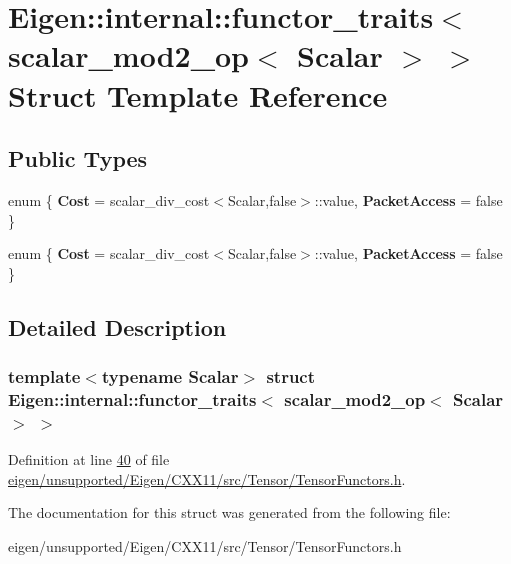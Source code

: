 \hypertarget{struct_eigen_1_1internal_1_1functor__traits_3_01scalar__mod2__op_3_01_scalar_01_4_01_4}{}\section{Eigen\+:\+:internal\+:\+:functor\+\_\+traits$<$ scalar\+\_\+mod2\+\_\+op$<$ Scalar $>$ $>$ Struct Template Reference}
\label{struct_eigen_1_1internal_1_1functor__traits_3_01scalar__mod2__op_3_01_scalar_01_4_01_4}
\subsection*{Public Types}
\begin{DoxyCompactItemize}
\item 
\mbox{\label{struct_eigen_1_1internal_1_1functor__traits_3_01scalar__mod2__op_3_01_scalar_01_4_01_4_a5255aa098ccb7fec717f0b2f7058271e}} 
enum \{ {\bfseries Cost} = scalar\+\_\+div\+\_\+cost$<$Scalar,false$>$\+:\+:value, 
{\bfseries Packet\+Access} = false
 \}
\item 
\mbox{\label{struct_eigen_1_1internal_1_1functor__traits_3_01scalar__mod2__op_3_01_scalar_01_4_01_4_a14d232238eb4d7eda8fd2d42fb7a45c4}} 
enum \{ {\bfseries Cost} = scalar\+\_\+div\+\_\+cost$<$Scalar,false$>$\+:\+:value, 
{\bfseries Packet\+Access} = false
 \}
\end{DoxyCompactItemize}


\subsection{Detailed Description}
\subsubsection*{template$<$typename Scalar$>$\newline
struct Eigen\+::internal\+::functor\+\_\+traits$<$ scalar\+\_\+mod2\+\_\+op$<$ Scalar $>$ $>$}



Definition at line \hyperlink{eigen_2unsupported_2_eigen_2_c_x_x11_2src_2_tensor_2_tensor_functors_8h_source_l00040}{40} of file \hyperlink{eigen_2unsupported_2_eigen_2_c_x_x11_2src_2_tensor_2_tensor_functors_8h_source}{eigen/unsupported/\+Eigen/\+C\+X\+X11/src/\+Tensor/\+Tensor\+Functors.\+h}.



The documentation for this struct was generated from the following file\+:\begin{DoxyCompactItemize}
\item 
eigen/unsupported/\+Eigen/\+C\+X\+X11/src/\+Tensor/\+Tensor\+Functors.\+h\end{DoxyCompactItemize}
